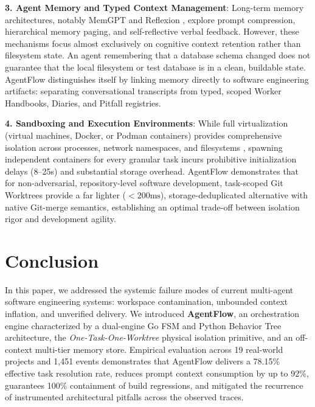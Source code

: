 \documentclass[conference]{IEEEtran}
\begin{document}
\textbf{3. Agent Memory and Typed Context Management}: Long-term memory architectures, notably MemGPT \cite{packer2023memgpt} and Reflexion \cite{shinn2024reflexion}, explore prompt compression, hierarchical memory paging, and self-reflective verbal feedback. However, these mechanisms focus almost exclusively on cognitive context retention rather than filesystem state. An agent remembering that a database schema changed does not guarantee that the local filesystem or test database is in a clean, buildable state. AgentFlow distinguishes itself by linking memory directly to software engineering artifacts: separating conversational transcripts from typed, scoped Worker Handbooks, Diaries, and Pitfall registries.

\textbf{4. Sandboxing and Execution Environments}: While full virtualization (virtual machines, Docker, or Podman containers) provides comprehensive isolation across processes, network namespaces, and filesystems \cite{mialon2023gaia}, spawning independent containers for every granular task incurs prohibitive initialization delays (8--25s) and substantial storage overhead. AgentFlow demonstrates that for non-adversarial, repository-level software development, task-scoped Git Worktrees provide a far lighter ($<200\text{ms}$), storage-deduplicated alternative with native Git-merge semantics, establishing an optimal trade-off between isolation rigor and development agility.

\section{Conclusion}
\label{sec:conclusion}

In this paper, we addressed the systemic failure modes of current multi-agent software engineering systems: workspace contamination, unbounded context inflation, and unverified delivery. We introduced \textbf{AgentFlow}, an orchestration engine characterized by a dual-engine Go FSM and Python Behavior Tree architecture, the \textit{One-Task-One-Worktree} physical isolation primitive, and an off-context multi-tier memory store. Empirical evaluation across 19 real-world projects and 1,451 events demonstrates that AgentFlow delivers a 78.15\% effective task resolution rate, reduces prompt context consumption by up to 92\%, guarantees 100\% containment of build regressions, and mitigated the recurrence of instrumented architectural pitfalls across the observed traces.
\end{document}
